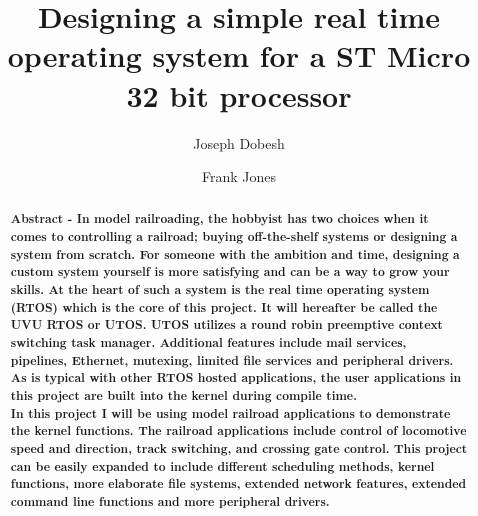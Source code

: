 \documentclass[acmlarge,screen]{acmart}
\begin{document}
\title{Designing a simple real time operating system for a ST Micro 32 bit processor}


\author{Joseph Dobesh}

\author{Frank Jones}
\renewcommand{\shortauthors}{Joseph Dobesh}

\begin{abstract}
\textbf{Abstract - In model railroading, the hobbyist has two choices when it comes to controlling a railroad; buying off-the-shelf systems or designing a system from scratch. For someone with the ambition and time, designing a custom system yourself is more satisfying and can be a way to grow your skills. At the heart of such a system is the real time operating system (RTOS) which is the core of this project. It will hereafter be called the UVU RTOS or UTOS. UTOS utilizes a round robin preemptive context switching task manager. Additional features include mail services, pipelines, Ethernet, mutexing, limited file services and peripheral drivers. As is typical with other RTOS hosted applications, the user applications in this project are built into the kernel during compile time.}\\

\textbf{In this project I will be using model railroad applications to demonstrate the kernel functions. The railroad applications include control of locomotive speed and direction, track switching, and crossing gate control. This project can be easily expanded to include different scheduling methods, kernel functions, more elaborate file systems, extended network features, extended command line functions and more peripheral drivers.}
\end{abstract}
\end{document}
